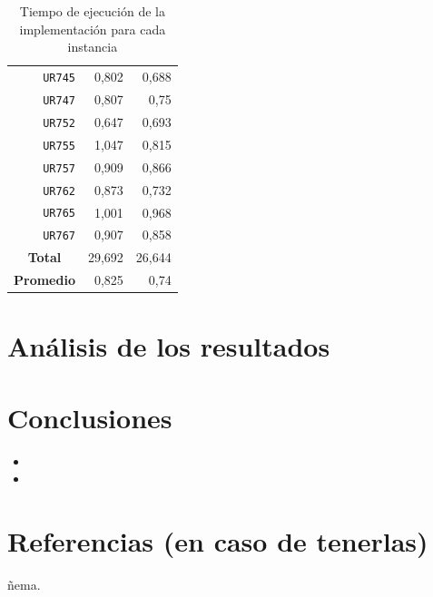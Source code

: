\documentclass[11pt]{article}
\begin{document}
\begin{table}[htbp]
\begin{center}
\begin{tabular}{|r|r|r|}
   \texttt{UR745} & 0,802 & 0,688 \\
   \texttt{UR747} & 0,807 & 0,75 \\
   \texttt{UR752} & 0,647 & 0,693 \\
   \texttt{UR755} & 1,047 & 0,815 \\
   \texttt{UR757} & 0,909 & 0,866 \\
   \texttt{UR762} & 0,873 & 0,732 \\
   \texttt{UR765} & 1,001 & 0,968 \\
   \texttt{UR767} & 0,907 & 0,858 \\ \hline
   \multicolumn{1}{|c|}{\textbf{Total}} & 29,692 & 26,644 \\ \hline
   \multicolumn{1}{|c|}{\textbf{Promedio}} & 0,825 & 0,74 \\ \hline
   \end{tabular}
   \end{center}
   \caption{Tiempo de ejecución de la implementación para cada instancia}
   \label{tablaTiempos}
   \end{table}
   

\section{Análisis de los resultados}


\section{Conclusiones}

\begin{itemize}
   \item 
   \item 
\end{itemize}

\section{Referencias (en caso de tenerlas)}

ñema. \\
\end{document}

